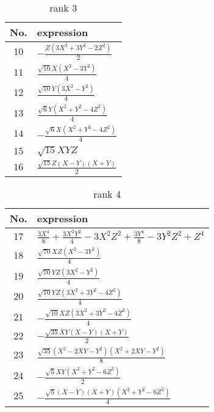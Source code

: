 \documentclass[fleqn,8pt,landscape]{jsarticle}
\begin{document}
\begin{table}[ht!]
\begin{center}
\caption{rank 3}
\renewcommand{\arraystretch}{1.3}
\begin{tabular}{cl} \hline \hline
No. & expression \\ \hline
$ 10 $ & $ - \frac{Z \left(3 X^{2} + 3 Y^{2} - 2 Z^{2}\right)}{2} $ \\
$ 11 $ & $ \frac{\sqrt{10} X \left(X^{2} - 3 Y^{2}\right)}{4} $ \\
$ 12 $ & $ \frac{\sqrt{10} Y \left(3 X^{2} - Y^{2}\right)}{4} $ \\
$ 13 $ & $ \frac{\sqrt{6} Y \left(X^{2} + Y^{2} - 4 Z^{2}\right)}{4} $ \\
$ 14 $ & $ - \frac{\sqrt{6} X \left(X^{2} + Y^{2} - 4 Z^{2}\right)}{4} $ \\
$ 15 $ & $ \sqrt{15} X Y Z $ \\
$ 16 $ & $ \frac{\sqrt{15} Z \left(X - Y\right) \left(X + Y\right)}{2} $ \\
 \hline \hline
\end{tabular}
\end{center}
\end{table}
\begin{table}[ht!]
\begin{center}
\caption{rank 4}
\renewcommand{\arraystretch}{1.3}
\begin{tabular}{cl} \hline \hline
No. & expression \\ \hline
$ 17 $ & $ \frac{3 X^{4}}{8} + \frac{3 X^{2} Y^{2}}{4} - 3 X^{2} Z^{2} + \frac{3 Y^{4}}{8} - 3 Y^{2} Z^{2} + Z^{4} $ \\
$ 18 $ & $ \frac{\sqrt{70} X Z \left(X^{2} - 3 Y^{2}\right)}{4} $ \\
$ 19 $ & $ \frac{\sqrt{70} Y Z \left(3 X^{2} - Y^{2}\right)}{4} $ \\
$ 20 $ & $ \frac{\sqrt{10} Y Z \left(3 X^{2} + 3 Y^{2} - 4 Z^{2}\right)}{4} $ \\
$ 21 $ & $ - \frac{\sqrt{10} X Z \left(3 X^{2} + 3 Y^{2} - 4 Z^{2}\right)}{4} $ \\
$ 22 $ & $ - \frac{\sqrt{35} X Y \left(X - Y\right) \left(X + Y\right)}{2} $ \\
$ 23 $ & $ \frac{\sqrt{35} \left(X^{2} - 2 X Y - Y^{2}\right) \left(X^{2} + 2 X Y - Y^{2}\right)}{8} $ \\
$ 24 $ & $ - \frac{\sqrt{5} X Y \left(X^{2} + Y^{2} - 6 Z^{2}\right)}{2} $ \\
$ 25 $ & $ - \frac{\sqrt{5} \left(X - Y\right) \left(X + Y\right) \left(X^{2} + Y^{2} - 6 Z^{2}\right)}{4} $ \\
 \hline \hline
\end{tabular}
\end{center}
\end{table}
\end{document}
